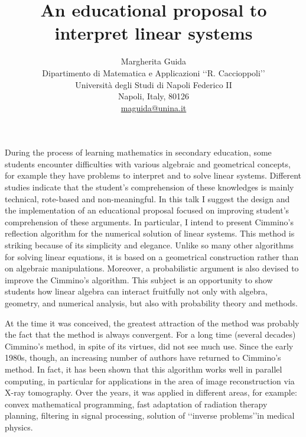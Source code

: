 \documentclass[12pt]{article}
\begin{document}
\title{An educational proposal to interpret linear systems}

\author{Margherita  Guida\\
Dipartimento di Matematica e Applicazioni \lq\lq R. Caccioppoli\rq\rq \\
Universit\`a degli Studi di Napoli Federico II\\
Napoli, Italy, 80126 \\
\url{maguida@unina.it}}

\date{}

\maketitle


During the process of learning mathematics in secondary education, some students encounter difficulties with various algebraic and geometrical concepts, for example they have problems to interpret and to solve linear systems. Different studies indicate that the student's comprehension of these knowledges is mainly technical, rote-based and non-meaningful. In this talk I suggest the design and the implementation of an educational proposal focused on improving student's comprehension of these arguments. In particular, I intend to present Cimmino's reflection algorithm for the numerical solution of linear systems.
This method is striking because of its simplicity and elegance. Unlike so many other algorithms for solving linear equations, it is based on a geometrical construction rather than on algebraic manipulations.  Moreover, a probabilistic argument is also devised to improve the Cimmino's algorithm. This subject is an opportunity to show students how linear algebra can interact fruitfully not only with algebra, geometry, and numerical analysis, but also with probability theory and methods.

At the time it was conceived, the greatest attraction of the method was probably the fact that the method is always convergent. For a long time (several decades) Cimmino's method, in spite of its virtues, did not see much use. Since the early 1980s, though, an increasing number of authors have returned to Cimmino's method. In fact, it has been shown that this algorithm works well in parallel computing, in particular for applications in the area of image reconstruction via X-ray tomography. Over the years, it  was applied in different areas, for example: convex mathematical programming, fast adaptation of radiation therapy planning, filtering in signal processing, solution of \lq\lq inverse problems\rq\rq  in medical physics.
\end{document}

